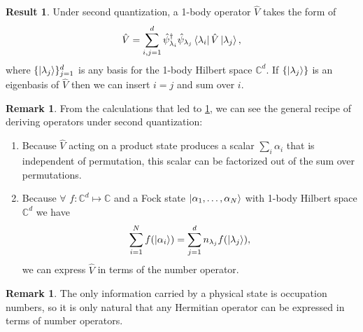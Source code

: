 \documentclass{article}
\theoremstyle{definition}
\newtheorem{res}[mot]{Result}
\newtheorem{rem}[mot]{Remark}
\numberwithin{equation}{section}
\begin{document}
\begin{graybox}
\begin{res}
    \label{res:1-body-operators}
    Under second quantization, 
    a 1-body operator $\hat{V}$ 
    takes the form of
    \begin{equation}
        \hat{V}
        =
        \sum_{i,j=1}^{d}
        \hat{\psi}_{\lambda_{i}}^{\dagger}
        \hat{\psi}_{\lambda_{j}}
        \bra{\lambda_{i}} \hat{V} 
        \ket{\lambda_{j}},
    \label{eqn:1-body-operator-under-second-quantization}
    \end{equation}
    where $\{\ket{\lambda_{j}}\}_{j=1}^{d}$ 
    is any basis
    for the 1-body Hilbert space $\mathbb{C}^{d}$. 
    If $\left\{ \ket{\lambda_{j}} \right\}$ 
    is an eigenbasis of $\hat{V}$ then 
    we can insert $i = j$ and sum over $i$.
\end{res}
\end{graybox}

\begin{rem}
    \label{rem:recipe-for-calculating-2nd-quantized-operators}
    From the calculations that led to 
    \cref{res:1-body-operators}, 
    we can see the general recipe of 
    deriving operators under second quantization: 
    \begin{enumerate}
        \item 
        Because $\hat{V}$ acting on 
        a product state produces 
        a scalar
        $\sum_{i}\alpha_{i}$
        that is 
        independent of permutation, 
        this scalar can be factorized 
        out of the sum over permutations.
        \item
        Because 
        $\forall$ 
        $f: \mathbb{C}^{d} \mapsto \mathbb{C}$ 
        and a Fock state 
        $\ket{\alpha_1, \ldots ,\alpha_{N}}$ 
        with 1-body Hilbert space $\mathbb{C}^{d}$
        we have 
        \[
            \sum_{i = 1}^{N}
        f(\ket{\alpha_{i}})
        =
        \sum_{j=1}^{d}
        n_{\lambda_{j}}f(\ket{\lambda_{j}}),
        \]
        we can express $\hat{V}$ 
        in terms of the number operator.
    \end{enumerate}
\end{rem}

\begin{rem}
    The only information carried by a 
    physical state is occupation numbers, 
    so it is only natural that 
    any Hermitian operator can be 
    expressed in terms of 
    number operators. 
\end{rem}
\end{document}
